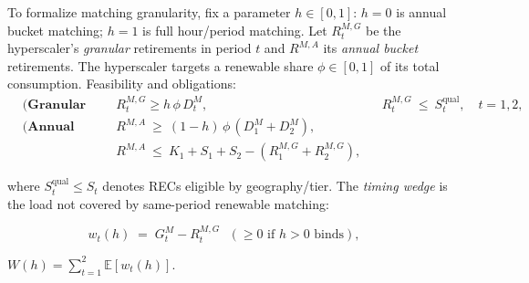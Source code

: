 \documentclass[a4paper,fleqn,longmktitle]{cas-sc}
\begin{document}
To formalize matching granularity, fix a parameter $h\in[0,1]$:
\(h=0\) is annual bucket matching; \(h=1\) is full hour/period matching.
Let $R^{M,G}_t$ be the hyperscaler's \emph{granular} retirements in period $t$
and $R^{M,A}$ its \emph{annual bucket} retirements.
The hyperscaler targets a renewable share $\phi\in[0,1]$ of its total consumption.
Feasibility and obligations:
\begin{align}

\label{eq:gran_req}
&\textbf{(Granular requirement)} 

& R^{M,G}_t \ge h\,\phi\,D^M_t,

&& R^{M,G}_t \ \le\ S^{\text{qual}}_t, \quad t=1,2,\\

\label{eq:annual_req}
&\textbf{(Annual requirement)} & 

R^{M,A} \ \ge\ (1-h)\,\phi\,(D^M_1+D^M_2), \\

&& R^{M,A} \ \le\ K_1+S_1+S_2 - (R^{M,G}_1+R^{M,G}_2),
\end{align}

where $S^{\text{qual}}_t\le S_t$ denotes RECs eligible by geography/tier.
The \emph{timing wedge} is the load not covered by same-period renewable matching:


\begin{equation}
\label{eq:wedge}
w_t(h) \;=\; G^M_t - R^{M,G}_t \ \ \ (\ge 0 \text{ if } h>0 \text{ binds}),
\qquad
\end{equation}

\begin{center}
    $ W(h)=\sum_{t=1}^2 \mathbb{E}[w_t(h)].$
\end{center}
\end{document}
